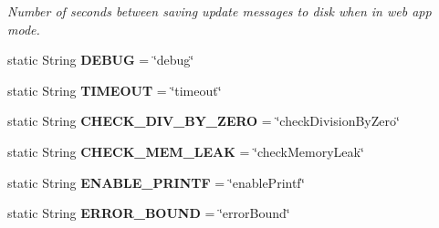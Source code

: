 \begin{DoxyCompactItemize}
\begin{DoxyCompactList}\small\item\em Number of seconds between saving update messages to disk when in web app mode. \end{DoxyCompactList}\item 
\hypertarget{classedu_1_1udel_1_1cis_1_1vsl_1_1civl_1_1config_1_1IF_1_1CIVLConstants_ab14978773112408581d8b9fce46f3403}{}static String {\bfseries D\+E\+B\+U\+G} = \char`\"{}debug\char`\"{}\label{classedu_1_1udel_1_1cis_1_1vsl_1_1civl_1_1config_1_1IF_1_1CIVLConstants_ab14978773112408581d8b9fce46f3403}

\item 
\hypertarget{classedu_1_1udel_1_1cis_1_1vsl_1_1civl_1_1config_1_1IF_1_1CIVLConstants_a56c027579a2d288966eeb881ebc90dd7}{}static String {\bfseries T\+I\+M\+E\+O\+U\+T} = \char`\"{}timeout\char`\"{}\label{classedu_1_1udel_1_1cis_1_1vsl_1_1civl_1_1config_1_1IF_1_1CIVLConstants_a56c027579a2d288966eeb881ebc90dd7}

\item 
\hypertarget{classedu_1_1udel_1_1cis_1_1vsl_1_1civl_1_1config_1_1IF_1_1CIVLConstants_a2b1ec7a81e193fbfb0dea8c196659072}{}static String {\bfseries C\+H\+E\+C\+K\+\_\+\+D\+I\+V\+\_\+\+B\+Y\+\_\+\+Z\+E\+R\+O} = \char`\"{}check\+Division\+By\+Zero\char`\"{}\label{classedu_1_1udel_1_1cis_1_1vsl_1_1civl_1_1config_1_1IF_1_1CIVLConstants_a2b1ec7a81e193fbfb0dea8c196659072}

\item 
\hypertarget{classedu_1_1udel_1_1cis_1_1vsl_1_1civl_1_1config_1_1IF_1_1CIVLConstants_a99a61571cfbe03804ac279d8960894b6}{}static String {\bfseries C\+H\+E\+C\+K\+\_\+\+M\+E\+M\+\_\+\+L\+E\+A\+K} = \char`\"{}check\+Memory\+Leak\char`\"{}\label{classedu_1_1udel_1_1cis_1_1vsl_1_1civl_1_1config_1_1IF_1_1CIVLConstants_a99a61571cfbe03804ac279d8960894b6}

\item 
\hypertarget{classedu_1_1udel_1_1cis_1_1vsl_1_1civl_1_1config_1_1IF_1_1CIVLConstants_ab63214a6a8c63a0e4056ce6583969bfc}{}static String {\bfseries E\+N\+A\+B\+L\+E\+\_\+\+P\+R\+I\+N\+T\+F} = \char`\"{}enable\+Printf\char`\"{}\label{classedu_1_1udel_1_1cis_1_1vsl_1_1civl_1_1config_1_1IF_1_1CIVLConstants_ab63214a6a8c63a0e4056ce6583969bfc}

\item 
\hypertarget{classedu_1_1udel_1_1cis_1_1vsl_1_1civl_1_1config_1_1IF_1_1CIVLConstants_a1991e06c81f1880e11fc68c5331a23bd}{}static String {\bfseries E\+R\+R\+O\+R\+\_\+\+B\+O\+U\+N\+D} = \char`\"{}error\+Bound\char`\"{}\label{classedu_1_1udel_1_1cis_1_1vsl_1_1civl_1_1config_1_1IF_1_1CIVLConstants_a1991e06c81f1880e11fc68c5331a23bd}


\end{DoxyCompactItemize}
